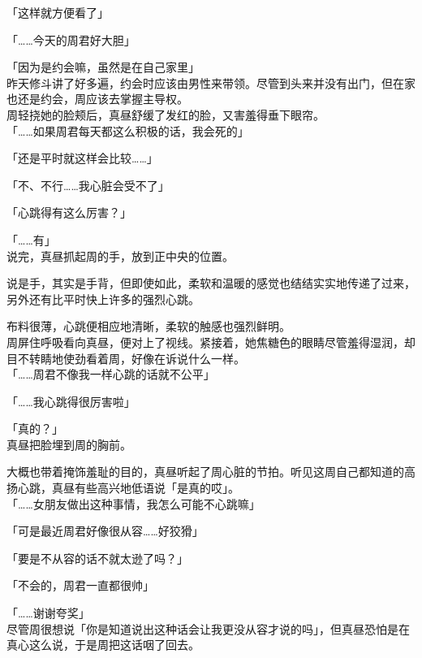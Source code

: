 「这样就方便看了」

「……今天的周君好大胆」

「因为是约会嘛，虽然是在自己家里」\\

昨天修斗讲了好多遍，约会时应该由男性来带领。尽管到头来并没有出门，但在家也还是约会，周应该去掌握主导权。\\

周轻挠她的脸颊后，真昼舒缓了发红的脸，又害羞得垂下眼帘。\\

「……如果周君每天都这么积极的话，我会死的」

「还是平时就这样会比较……」

「不、不行……我心脏会受不了」

「心跳得有这么厉害？」

「……有」\\

说完，真昼抓起周的手，放到正中央的位置。

说是手，其实是手背，但即使如此，柔软和温暖的感觉也结结实实地传递了过来，另外还有比平时快上许多的强烈心跳。

布料很薄，心跳便相应地清晰，柔软的触感也强烈鲜明。\\

周屏住呼吸看向真昼，便对上了视线。紧接着，她焦糖色的眼睛尽管羞得湿润，却目不转睛地使劲看着周，好像在诉说什么一样。\\

「……周君不像我一样心跳的话就不公平」

「……我心跳得很厉害啦」

「真的？」\\

真昼把脸埋到周的胸前。

大概也带着掩饰羞耻的目的，真昼听起了周心脏的节拍。听见这周自己都知道的高扬心跳，真昼有些高兴地低语说「是真的哎」。\\

「……女朋友做出这种事情，我怎么可能不心跳嘛」

「可是最近周君好像很从容……好狡猾」

「要是不从容的话不就太逊了吗？」

「不会的，周君一直都很帅」

「……谢谢夸奖」\\

尽管周很想说「你是知道说出这种话会让我更没从容才说的吗」，但真昼恐怕是在真心这么说，于是周把这话咽了回去。\\

